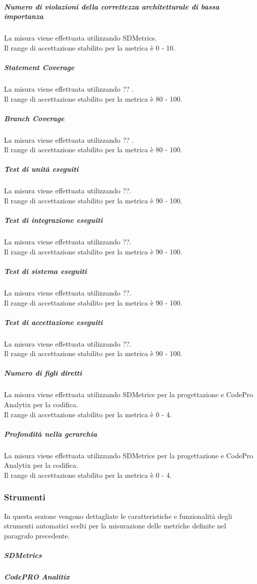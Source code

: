 			\subparagraph{Numero di violazioni della correttezza architetturale di bassa importanza}
			La misura viene effettuata utilizzando SDMetrics.
			\\Il range di accettazione stabilito per la metrica è 0 - 10.
			
			\subparagraph{Statement Coverage}
			La misura viene effettuata utilizzando ?? .
			\\Il range di accettazione stabilito per la metrica è 80 - 100.
			
			\subparagraph{Branch Coverage}
			La misura viene effettuata utilizzando ?? .
			\\Il range di accettazione stabilito per la metrica è 80 - 100.
			
			\subparagraph{Test di unità eseguiti}
			La misura viene effettuata utilizzando ??.
			\\Il range di accettazione stabilito per la metrica è 90 - 100.
			
			\subparagraph{Test di integrazione eseguiti}
			La misura viene effettuata utilizzando ??.
			\\Il range di accettazione stabilito per la metrica è 90 - 100.
			
			\subparagraph{Test di sistema eseguiti}
			La misura viene effettuata utilizzando ??.
			\\Il range di accettazione stabilito per la metrica è 90 - 100.
			
			\subparagraph{Test di accettazione eseguiti}
			La misura viene effettuata utilizzando ??.
			\\Il range di accettazione stabilito per la metrica è 90 - 100.
			
			\subparagraph{Numero di figli diretti}
			La misura viene effettuata utilizzando SDMetrics per la progettazione e CodePro Analytix per la codifica.
			\\Il range di accettazione stabilito per la metrica è 0 - 4.
			
			\subparagraph{Profondità nella gerarchia}
			La misura viene effettuata utilizzando SDMetrics per la progettazione e CodePro Analytix per la codifica.
			\\Il range di accettazione stabilito per la metrica è 0 - 4.

	\subsubsection{Strumenti}
	In questa sezione vengono dettagliate le caratteristiche e funzionalità degli strumenti automatici scelti per la misurazione delle metriche definite nel paragrafo precedente.
		\subparagraph{SDMetrics}
		\subparagraph{CodePRO Analitix}

